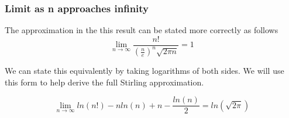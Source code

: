 \documentclass[a4paper]{article}
\begin{document}
\subsubsection{Limit as n approaches infinity}

The approximation in the this result can be stated more correctly as follows
\begin{equation} \label{stirling_limit}
\boxed{\lim_{n \to \infty} \frac{n!}{(\frac{n}{e})^n \sqrt{2\pi n}} = 1
}
\end{equation}

We can state this equivalently by taking logarithms of both sides. We will use this form to help derive the full Stirling approximation. 

\begin{equation} \label{stirling_limit_log}
\boxed{\lim_{n \to \infty} 
ln(n!) - nln(n) + n - \frac{ln(n)}{2}= ln(\sqrt{2\pi})
}
\end{equation}
\end{document}
